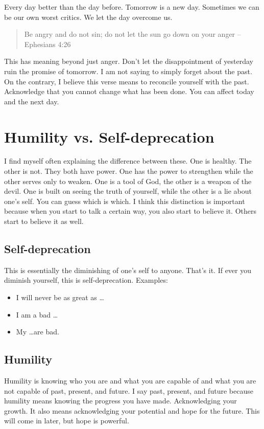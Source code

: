 \documentclass[11pt,a4paper,sans]{article}
\begin{document}
Every day better than the day before. Tomorrow is a new day. Sometimes we can be our own worst critics. We let the day overcome us. 

\begin{quote}
    Be angry and do not sin; do not let the sun go down on your anger -- Ephesians 4:26
\end{quote}

This has meaning beyond just anger. Don't let the disappointment of yesterday ruin the promise of tomorrow. I am not saying to simply forget about the past. On the contrary, I believe this verse means to reconcile yourself with the past. Acknowledge that you cannot change what has been done. You can affect today and the next day.

\section{Humility vs. Self-deprecation}
I find myself often explaining the difference between these. One is healthy. The other is not. They both have power. One has the power to strengthen while the other serves only to weaken. One is a tool of God, the other is a weapon of the devil. One is built on seeing the truth of yourself, while the other is a lie about one's self. You can guess which is which. I think this distinction is important because when you start to talk a certain way, you also start to believe it. Others start to believe it as well.

\subsection{Self-deprecation}
This is essentially the diminishing of one's self to anyone. That's it. If ever you diminish yourself, this is self-deprecation. Examples:
\begin{itemize}
    \item I will never be as great as \ldots
    \item I am a bad \ldots
    \item My \ldots are bad.
\end{itemize}

\subsection{Humility}
Humility is knowing who you are and what you are capable of and what you are not capable of past, present, and future. I say past, present, and future because humility means knowing the progress you have made. Acknowledging your growth. It also means acknowledging your potential and hope for the future. This will come in later, but hope is powerful. 
\end{document}
